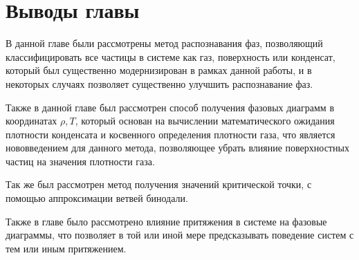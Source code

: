 \section{Выводы главы}\label{C2_4}

В данной главе были рассмотрены метод распознавания фаз, позволяющий классифицировать все частицы в системе как газ, поверхность или конденсат, который был существенно модернизирован в рамках данной работы, и в некоторых случаях позволяет существенно улучшить распознавание фаз. 

Также в данной главе был рассмотрен способ получения фазовых диаграмм в координатах $\rho, T$, который основан на вычислении математического ожидания плотности конденсата и косвенного определения плотности газа, что является нововведением для данного метода, позволяющее убрать влияние поверхностных частиц на значения плотности газа. 

Так же был рассмотрен метод получения значений критической точки, с помощью аппроксимации ветвей бинодали. 

Также в главе было рассмотрено влияние притяжения в системе на фазовые диаграммы, что позволяет в той или иной мере предсказывать поведение систем с тем или иным притяжением.
